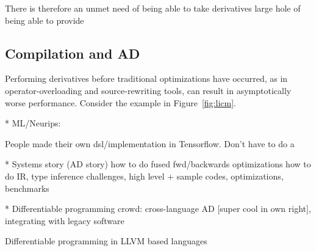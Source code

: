 There is therefore an unmet need of being able to take derivatives large hole of being able to provide 

\subsection{Compilation and AD}
Performing derivatives before traditional optimizations have occurred, as in operator-overloading and source-rewriting tools, can result in asymptotically worse performance. Consider the example in Figure~\ref{fig:licm}.






* ML/Neurips:

People made their own dsl/implementation in Tensorflow. Don't have to do a 

* Systems story (AD story) how to do fused fwd/backwards optimizations how to do IR, type inference challenges, high level
 + sample codes, optimizations, benchmarks

* Differentiable programming crowd: cross-language AD [super cool in own right], integrating with legacy software

Differentiable programming in LLVM based languages

